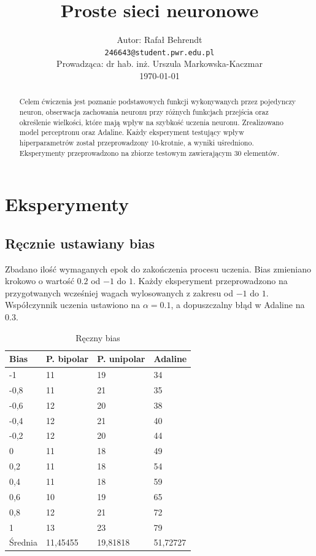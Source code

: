 \documentclass{article}
\title{ Proste sieci neuronowe }
\author{
  Autor: Rafał Behrendt \\
  \texttt{246643@student.pwr.edu.pl} \\
  Prowadząca: dr hab. inż. Urszula Markowska-Kaczmar \\
  \today
}
\begin{document}
\maketitle

\begin{abstract}
  Celem ćwiczenia jest poznanie podstawowych funkcji wykonywanych przez pojedynczy neuron,
  obserwacja zachowania neuronu przy różnych funkcjach przejścia oraz określenie wielkości, 
  które mają wpływ na szybkość uczenia neuronu. Zrealizowano model perceptronu oraz Adaline.
  Każdy eksperyment testujący wpływ hiperparametrów został przeprowadzony 10-krotnie,
  a wyniki uśredniono. Eksperymenty przeprowadzono na zbiorze testowym zawierającym 30 elementów.
\end{abstract}

\newpage
\section{Eksperymenty}

\subsection{Ręcznie ustawiany bias}

Zbadano ilość wymaganych epok do zakończenia procesu uczenia.
Bias zmieniano krokowo o wartość $0.2$ od $-1$ do $1$. Każdy eksperyment przeprowadzono na przygotwanych
wcześniej wagach wylosowanych z zakresu od $-1$ do $1$. Współczynnik uczenia ustawiono na $\alpha = 0.1$,
a dopuszczalny błąd w Adaline na $0.3$.

\begin{table}[h]
  \centering
    
  \bgroup
  \def\arraystretch{1.3}
  \begin{tabular}{|l|l|l|l|}
  \hline
  Bias & P. bipolar & P. unipolar & Adaline  \\ \hline
  -1 & 11 & 19 & 34 \\ \hline
  -0,8 & 11 & 21 & 35 \\ \hline
  -0,6 & 12 & 20 & 38 \\ \hline
  -0,4 & 12 & 21 & 40 \\ \hline
  -0,2 & 12 & 20 & 44 \\ \hline
  0 & 11 & 18 & 49 \\ \hline
  0,2 & 11 & 18 & 54 \\ \hline
  0,4 & 11 & 18 & 59 \\ \hline
  0,6 & 10 & 19 & 65 \\ \hline
  0,8 & 12 & 21 & 72 \\ \hline
  1 & 13 & 23 & 79 \\ \hline
  Średnia & 11,45455 & 19,81818 & 51,72727 \\ \hline
  \end{tabular}
  \egroup
  \vspace{10px}
  \caption{Ręczny bias}
\end{table}
\end{document}
